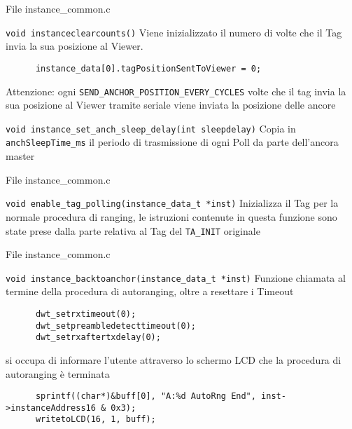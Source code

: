 \begin{frame}[fragile]{File instance\_common.c}
  \begin{block}{\lstinline!void instanceclearcounts()!}
    Viene inizializzato il numero di volte che il Tag invia la sua posizione al Viewer.
    \begin{lstlisting}
      instance_data[0].tagPositionSentToViewer = 0;
    \end{lstlisting}
    \textcolor{dgreen}{Attenzione:} ogni \lstinline!SEND_ANCHOR_POSITION_EVERY_CYCLES! volte che il tag invia la sua posizione al Viewer tramite seriale viene inviata
    la posizione delle ancore
  \end{block}
  \begin{block}{\lstinline!void instance_set_anch_sleep_delay(int sleepdelay)!}
    Copia in \lstinline!anchSleepTime_ms! il periodo di trasmissione di ogni Poll da parte dell'ancora master
  \end{block}
\end{frame}

\begin{frame}{File instance\_common.c}
  \begin{block}{\lstinline!void enable_tag_polling(instance_data_t *inst)!}
    Inizializza il Tag per la normale procedura di ranging, le istruzioni contenute in questa funzione sono state
    prese dalla parte relativa al Tag del \lstinline!TA_INIT! originale
  \end{block}
\end{frame}

\begin{frame}[fragile]{File instance\_common.c}
  \begin{block}{\lstinline!void instance_backtoanchor(instance_data_t *inst)!}
    Funzione chiamata al termine della procedura di autoranging, oltre a resettare i Timeout
    \begin{lstlisting}
      dwt_setrxtimeout(0);
      dwt_setpreambledetecttimeout(0);
      dwt_setrxaftertxdelay(0);
    \end{lstlisting}
    si occupa di informare l'utente attraverso lo schermo LCD che la procedura di autoranging è terminata
    \begin{lstlisting}
      sprintf((char*)&buff[0], "A:%d AutoRng End", inst->instanceAddress16 & 0x3);
      writetoLCD(16, 1, buff);
    \end{lstlisting}
  \end{block}
\end{frame}

